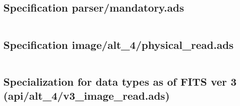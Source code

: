 \documentclass[a4paper,10pt]{article}
\begin{document}
\subsection{Specification parser/mandatory.ads}
\inputminted[linenos, fontsize=\footnotesize]{ada}{../lib/src/parser/mandatory.ads}

\subsection{Specification image/alt\_4/physical\_read.ads}
\inputminted[linenos, fontsize=\footnotesize]{ada}{../lib/src/image/alt_4/physical_read.ads}

\subsection{Specialization for data types as of FITS ver 3 (api/alt\_4/v3\_image\_read.ads)}
\inputminted[linenos, fontsize=\footnotesize]{ada}{../lib/src/api/alt_4/v3_image_read.ads}
\end{document}
